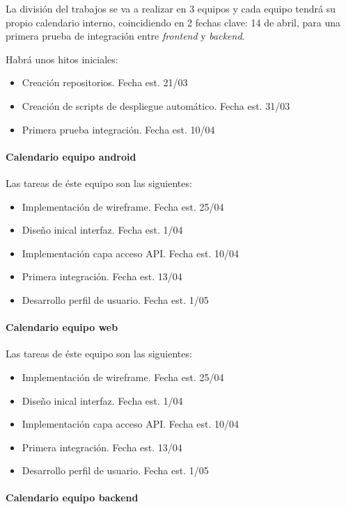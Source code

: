 \documentclass{article}
\begin{document}
La división del trabajos se va a realizar en 3 equipos y cada equipo tendrá su propio calendario interno, coincidiendo en 2 fechas clave:
14 de abril, para una primera prueba de integración entre \textit{frontend} y \textit{backend}.

Habrá unos hitos iniciales:
\begin{itemize}
    \item Creación repositorios. Fecha est. 21/03
    \item Creación de scripts de despliegue automático. Fecha est. 31/03
    \item Primera prueba integración. Fecha est. 10/04
\end{itemize}

\paragraph{Calendario equipo android}

Las tareas de éste equipo son las siguientes:
\begin{itemize}

    \item Implementación de wireframe. Fecha est. 25/04
    \item Diseño inical interfaz. Fecha est. 1/04
    \item Implementación capa acceso API. Fecha est. 10/04
    \item Primera integración. Fecha est. 13/04
    \item Desarrollo perfil de usuario. Fecha est. 1/05
\end{itemize}

\paragraph{Calendario equipo web}

Las tareas de éste equipo son las siguientes:
\begin{itemize}

    \item Implementación de wireframe. Fecha est. 25/04
    \item Diseño inical interfaz. Fecha est. 1/04
    \item Implementación capa acceso API. Fecha est. 10/04
    \item Primera integración. Fecha est. 13/04
    \item Desarrollo perfil de usuario. Fecha est. 1/05
\end{itemize}
\paragraph{Calendario equipo backend}
\end{document}
